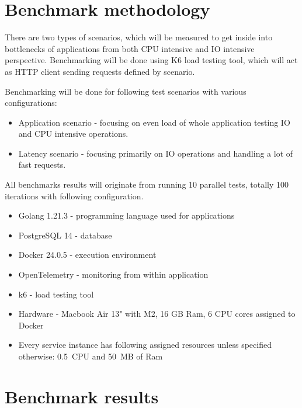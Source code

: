 
\section{Benchmark methodology}
There are two types of scenarios, which will be measured to get inside into bottlenecks of applications from both CPU intensive and IO intensive perspective. Benchmarking will be done using K6 load testing tool, which will act as HTTP client sending requests defined by scenario.

Benchmarking will be done for following test scenarios with various configurations:
\begin{itemize}
    \item Application scenario - focusing on even load of whole application testing IO and CPU intensive operations.
    \item Latency scenario - focusing primarily on IO operations and handling a lot of fast requests.
\end{itemize}

All benchmarks results will originate from running 10 parallel tests, totally 100 iterations with following configuration.
\begin{itemize}
    \item Golang 1.21.3 - programming language used for applications
    \item PostgreSQL 14 - database
    \item Docker 24.0.5 - execution environment
    \item OpenTelemetry - monitoring from within application
    \item k6 - load testing tool
    \item Hardware - Macbook Air 13" with M2, 16 GB Ram, 6 CPU cores assigned to Docker
    \item Every service instance has following assigned resources unless specified otherwise: 0.5~CPU and 50~MB of Ram
\end{itemize}


\section{Benchmark results}
\label{section:benchmark_results}

